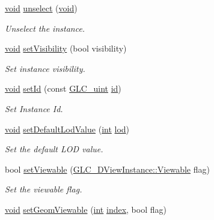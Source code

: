 \begin{DoxyCompactItemize}
\hyperlink{group___u_a_v_objects_plugin_ga444cf2ff3f0ecbe028adce838d373f5c}{void} \hyperlink{class_g_l_c__3_d_view_instance_adb4a4d38d8e9f47cc0d7bea624e62946}{unselect} (\hyperlink{group___u_a_v_objects_plugin_ga444cf2ff3f0ecbe028adce838d373f5c}{void})
\begin{DoxyCompactList}\small\item\em Unselect the instance. \end{DoxyCompactList}\item 
\hyperlink{group___u_a_v_objects_plugin_ga444cf2ff3f0ecbe028adce838d373f5c}{void} \hyperlink{class_g_l_c__3_d_view_instance_af2f3e773f7b9726233bcfe3ee9ee45e7}{set\-Visibility} (bool visibility)
\begin{DoxyCompactList}\small\item\em Set instance visibility. \end{DoxyCompactList}\item 
\hyperlink{group___u_a_v_objects_plugin_ga444cf2ff3f0ecbe028adce838d373f5c}{void} \hyperlink{class_g_l_c__3_d_view_instance_a9c337cedbc3a84afbfc6a2947a87573b}{set\-Id} (const \hyperlink{glc__global_8h_abf950976fabed69026558df8e2da6c6b}{G\-L\-C\-\_\-uint} \hyperlink{glext_8h_a58c2a664503e14ffb8f21012aabff3e9}{id})
\begin{DoxyCompactList}\small\item\em Set Instance Id. \end{DoxyCompactList}\item 
\hyperlink{group___u_a_v_objects_plugin_ga444cf2ff3f0ecbe028adce838d373f5c}{void} \hyperlink{class_g_l_c__3_d_view_instance_a87cea0c83cdd0a898471bba08f33b6b1}{set\-Default\-Lod\-Value} (\hyperlink{ioapi_8h_a787fa3cf048117ba7123753c1e74fcd6}{int} \hyperlink{glext_8h_a5b5a34b88a28ab9c203c2b432f6168b6}{lod})
\begin{DoxyCompactList}\small\item\em Set the default L\-O\-D value. \end{DoxyCompactList}\item 
bool \hyperlink{class_g_l_c__3_d_view_instance_ab8021b80c4fb019f71e36e214f253c73}{set\-Viewable} (\hyperlink{class_g_l_c__3_d_view_instance_a34f78b0d3fce3d0325b4538d707c5d2b}{G\-L\-C\-\_\-D\-View\-Instance\-::\-Viewable} flag)
\begin{DoxyCompactList}\small\item\em Set the viewable flag. \end{DoxyCompactList}\item 
\hyperlink{group___u_a_v_objects_plugin_ga444cf2ff3f0ecbe028adce838d373f5c}{void} \hyperlink{class_g_l_c__3_d_view_instance_a6141c21a84ab9d77e65e2cec01123fd6}{set\-Geom\-Viewable} (\hyperlink{ioapi_8h_a787fa3cf048117ba7123753c1e74fcd6}{int} \hyperlink{glext_8h_ab47dd9958bcadea08866b42bf358e95e}{index}, bool flag)

\end{DoxyCompactItemize}
